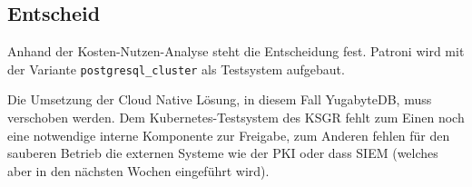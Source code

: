 
\clearpage
\begin{flushleft}
    \subsection{Entscheid}
    Anhand der Kosten-Nutzen-Analyse steht die Entscheidung fest.
    Patroni wird mit der Variante \texttt{postgresql\_cluster} als Testsystem aufgebaut.
\end{flushleft}
\begin{flushleft}
    Die Umsetzung der Cloud Native Lösung, in diesem Fall YugabyteDB, muss verschoben werden.
    Dem \Gls{Kubernetes}-Testsystem des KSGR fehlt zum Einen noch eine notwendige interne Komponente zur Freigabe,
    zum Anderen fehlen für den sauberen Betrieb die externen Systeme wie der \Gls{PKI} oder dass \Gls{SIEM} (welches aber in den nächsten Wochen eingeführt wird).
\end{flushleft}